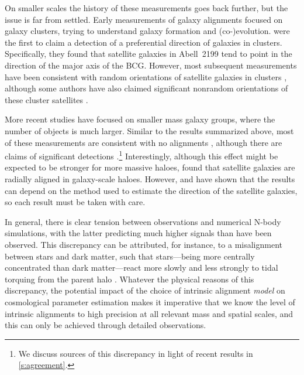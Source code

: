 On smaller scales the history of these measurements goes back further, but the issue is far from 
settled. Early measurements of galaxy alignments focused on galaxy clusters, trying to understand
galaxy formation and (co-)evolution. \cite{rood72} were the first to claim a detection of a 
preferential direction of galaxies in clusters. Specifically, they found that satellite galaxies in 
Abell~2199 tend to point in the direction of the major axis of the BCG. However, most subsequent 
measurements have been consistent with random orientations of satellite galaxies in clusters 
\citep[e.g.,][]{hawley75,thompson76,dekel85,vankampen90,trevese92,panko09,hung12}, although some
authors have also claimed significant nonrandom orientations of these cluster satellites 
\citep[e.g.,][]{djorgovski83,godlowski98,godlowski10,baier03,plionis03}.

More recent studies have focused on smaller mass galaxy groups, where the number of objects is much 
larger. Similar to the results summarized above, most of these measurements are consistent with no 
alignments \citep{bernstein02,hao11,schneider13,chisari14}, although there are claims of 
significant detections \citep[e.g.,][]{pereira05,faltenbacher07_alignment}.\footnote{We discuss sources of 
this discrepancy in light of recent results in \cref{s:agreement}.} Interestingly, although this 
effect might be expected to be stronger for more massive haloes, \cite{agustsson06} found that 
satellite galaxies are radially aligned in galaxy-scale haloes. However, \cite{hao11} and 
\cite{schneider13} have shown that the results can depend on the method used to estimate the 
direction of the satellite galaxies, so each result must be taken with care.

In general, there is clear tension between observations and numerical N-body simulations, with 
the latter predicting much higher signals than have been observed. This discrepancy can be 
attributed, for instance, to a misalignment between stars and dark matter, such that stars---being 
more centrally concentrated than dark matter---react more slowly and less strongly to tidal 
torquing from the parent halo \citep{pereira10,tenneti14}. Whatever the physical reasons of this 
discrepancy, the potential impact of the choice of intrinsic alignment {\em model} on cosmological 
parameter estimation \citep{kirk12} makes it imperative that we know the level of intrinsic 
alignments to high precision at all relevant mass and spatial scales, and this can only be achieved 
through detailed observations.

